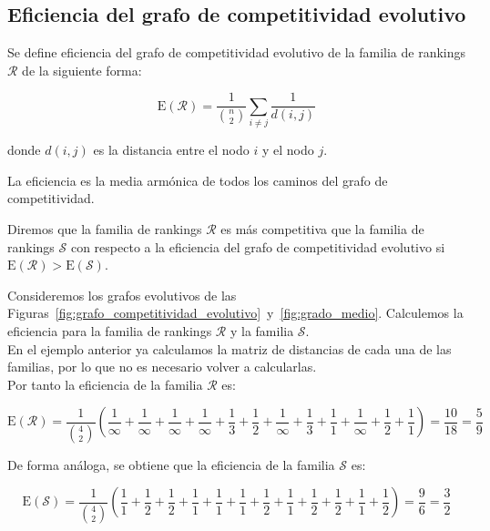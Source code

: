 \subsection*{Eficiencia del grafo de competitividad evolutivo}

\begin{defi}
Se define eficiencia del grafo de competitividad evolutivo de la familia de rankings $\mathcal{R}$ de la siguiente forma:

\begin{equation}
\mathrm{E}(\mathcal{R}) = \dfrac{1}{\binom{n}{2}} \sum_{i\neq j} \dfrac{1}{d(i,j)}
\end{equation}

donde $d(i,j)$ es la distancia entre el nodo $i$ y el nodo $j$.
\end{defi}

La eficiencia es la media armónica de todos los caminos del grafo de competitividad.

\begin{defi}
Diremos que la familia de rankings $\mathcal{R}$ es más competitiva que la familia de rankings $\mathcal{S}$ con respecto a la eficiencia del grafo de competitividad evolutivo si $\mathrm{E}(\mathcal{R}) > \mathrm{E}(\mathcal{S})$.
\end{defi}

\begin{ejemplo}
Consideremos los grafos evolutivos de las Figuras~\ref{fig:grafo_competitividad_evolutivo}~y~\ref{fig:grado_medio}. Calculemos la eficiencia para la familia de rankings $\mathcal{R}$ y la familia $\mathcal{S}$.\\

En el ejemplo anterior ya calculamos la matriz de distancias de cada una de las familias, por lo que no es necesario volver a calcularlas.\\

Por tanto la eficiencia de la familia $\mathcal{R}$ es:

\begin{equation*}
\mathrm{E}(\mathcal{R}) = \dfrac{1}{\binom{4}{2}} \left( \dfrac{1}{\infty} + \dfrac{1}{\infty} + \dfrac{1}{\infty} + \dfrac{1}{\infty} + \dfrac{1}{3} + \dfrac{1}{2} + \dfrac{1}{\infty} + \dfrac{1}{3} + \dfrac{1}{1} + \dfrac{1}{\infty} + \dfrac{1}{2} + \dfrac{1}{1}\right) = \dfrac{10}{18} = \dfrac{5}{9}  
\end{equation*}

De forma análoga, se obtiene que la eficiencia de la familia $\mathcal{S}$ es:

\begin{equation*}
\mathrm{E}(\mathcal{S}) = \dfrac{1}{\binom{4}{2}} \left( \dfrac{1}{1} + \dfrac{1}{2} + \dfrac{1}{2} + \dfrac{1}{1} + \dfrac{1}{1} + \dfrac{1}{1} + \dfrac{1}{2} + \dfrac{1}{1} + \dfrac{1}{2} + \dfrac{1}{2} + \dfrac{1}{1} + \dfrac{1}{2}\right) = \dfrac{9}{6} = \dfrac{3}{2} 
\end{equation*}

\end{ejemplo}

